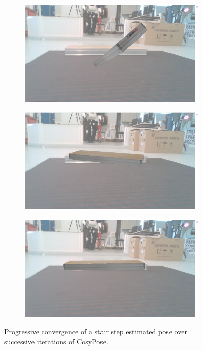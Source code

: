 \begin{figure}[]
    \begin{subfigure}{.5\textwidth} %
        \centering
        \includegraphics[width=.9\linewidth]{figures/cosyslam/convergence_1.png}  %
    \end{subfigure}
    \begin{subfigure}{.5\textwidth}
        \centering
        \includegraphics[width=.9\linewidth]{figures/cosyslam/convergence_2.png}  
    \end{subfigure}

    \label{fig:fig}
    \begin{subfigure}{\textwidth}
        \centering
        \includegraphics[width=.45\linewidth]{figures/cosyslam/convergence_3.png}   %
        
    \end{subfigure}
    \caption{\label{fig:cosypose-convergence} Progressive convergence of a stair step estimated pose over successive iterations of CosyPose.}
\end{figure}


